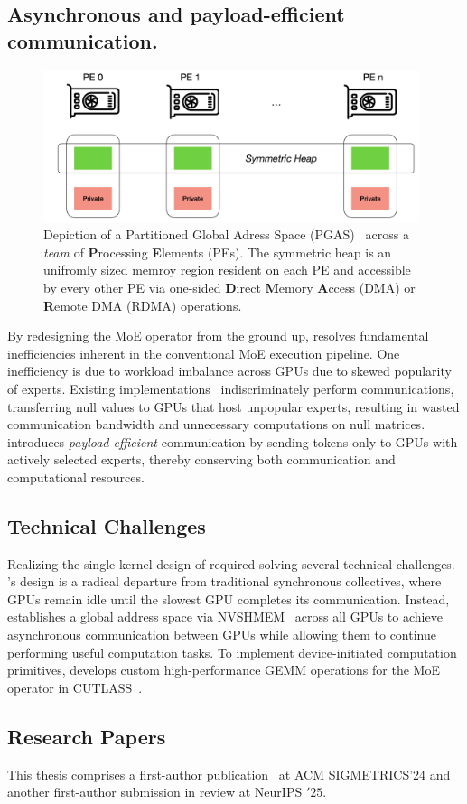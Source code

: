 \subsection{Asynchronous and payload-efficient communication.}\label{subsec:asynchronous-and-payload-efficient-communication.}
\begin{figure}[!ht]
    \centering
    \includegraphics[width=0.98\textwidth, keepaspectratio]{figures/pgas}
    \caption{Depiction of a Partitioned Global Adress Space (PGAS)~\cite{10.1145/1278177.1278183}
        across a \textit{team} of \textbf{P}rocessing \textbf{E}lements (PEs). The symmetric heap is an
    unifromly sized memroy region resident on each PE and accessible by every other PE via one-sided
    \textbf{D}irect \textbf{M}emory \textbf{A}ccess (DMA) or \textbf{R}emote DMA (RDMA) operations.}
    \label{fig:pgas}
\end{figure}
By redesigning the MoE operator from the ground up,
\sysname resolves fundamental inefficiencies inherent
in the conventional MoE execution pipeline.
One inefficiency is due to workload imbalance across GPUs due to
skewed popularity of experts.
Existing implementations~\cite{pmlr-v162-rajbhandari22a} indiscriminately perform \alltoall communications,
transferring null values to GPUs that host unpopular experts,
resulting in wasted communication bandwidth and unnecessary computations on null matrices.
\sysname introduces \emph{payload-efficient} communication
by sending tokens only to GPUs with actively selected experts,
thereby conserving both communication and computational resources.
\subsection{Technical Challenges}\label{subsec:technical-challenges}
Realizing the single-kernel design of \sysname required solving several
technical challenges.
\sysname's design is a radical departure from
traditional synchronous \alltoall collectives,
where GPUs remain idle until the slowest GPU completes its communication.
Instead, \sysname establishes a global address space via NVSHMEM~\cite{nvshm} across all GPUs to
achieve asynchronous communication between GPUs while allowing them to
continue performing useful computation tasks.
To implement device-initiated computation primitives,
\sysname develops custom high-performance GEMM operations for the MoE operator in
CUTLASS~\cite{Thakkar_CUTLASS_2023}.
\subsection{Research Papers}\label{subsec:research-papers}
This thesis comprises a first-author publication~\cite{10.1145/3725536.3725539} at ACM SIGMETRICS'24 and another first-author
submission in review at NeurIPS \('25\).

